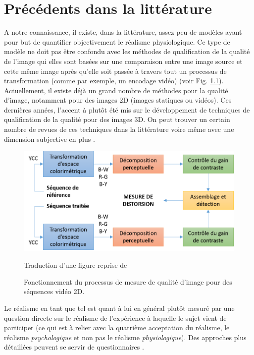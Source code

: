\chapter{Précédents dans la littérature}
\par A notre connaissance, il existe, dans la littérature, assez peu de modèles ayant pour but de quantifier objectivement le réalisme physiologique. Ce type de modèle ne doit pas être confondu avec les méthodes de qualification de la qualité de l'image qui elles sont basées sur une comparaison entre une image source et cette même image après qu'elle soit passée à travers tout un processus de transformation (comme par exemple, un encodage vidéo) \citep{cadik_human_2004, winkler_quality_2000} (voir Fig. \ref{fig:quality_process}). Actuellement, il existe déjà un grand nombre de méthodes pour la qualité d'image, notamment pour des images 2D (images statiques ou vidéos). Ces dernières années, l'accent à plutôt été mis sur le développement de techniques de qualification de la qualité pour des images 3D. On peut trouver un certain nombre de revues de ces techniques dans la littérature \citep{moorthy_subjective_2013, moorthy_survey_2013} voire même avec une dimension subjective en plus \citep{beghdadi_survey_2013}.
	
	\begin{figure}[h]
		\centering
		\includegraphics[scale=1]{Figures/ImageQualityWinkler}
		\caption{Fonctionnement du processus de mesure de qualité d'image pour des séquences vidéo 2D.}{Traduction d'une figure reprise de \cite{winkler_quality_2000}}
		\label{fig:quality_process}
	\end{figure}
	
	\par Le réalisme en tant que tel est quant à lui en général plutôt mesuré par une question directe sur le réalisme de l'expérience à laquelle le sujet vient de participer (ce qui est à relier avec la quatrième acceptation du réalisme, le réalisme \textit{psychologique} et non pas le réalisme \textit{physiologique}). Des approches plus détaillées peuvent se servir de questionnaires \citep{fucentese_evaluation_2015, fiard_initial_2014}.
	
